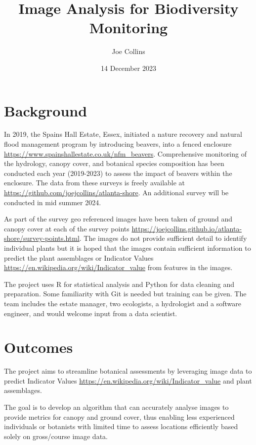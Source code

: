 \documentclass{roles}
\title{Image Analysis for Biodiversity Monitoring}
\author{Joe Collins}
\date{14 December 2023}
\begin{document}
\maketitle

\section*{Background}

In 2019, the Spains Hall Estate, Essex,
initiated a nature recovery and natural flood management program by introducing beavers,
into a fenced enclosure
\href{https://www.spainshallestate.co.uk/nfm\_beavers}{https://www.spainshallestate.co.uk/nfm\_beavers}.
Comprehensive monitoring of
the hydrology, canopy cover, and botanical species composition
has been conducted each year (2019-2023)
to assess the impact of beavers within the enclosure.
The data from these surveys is freely available at
\href{https://github.com/joejcollins/atlanta-shore}{https://github.com/joejcollins/atlanta-shore}.
An additional survey will be conducted in mid summer 2024.

As part of the survey geo referenced images have been taken
of ground and canopy cover at each of the survey points
\href{https://joejcollins.github.io/atlanta-shore/survey-points.html}{https://joejcollins.github.io/atlanta-shore/survey-points.html}.
The images do not provide sufficient detail to identify individual plants
but it is hoped that the images contain sufficient information to predict
the plant assemblages or Indicator Values
\href{https://en.wikipedia.org/wiki/Indicator\_value}{https://en.wikipedia.org/wiki/Indicator\_value}
from features in the images.

The project uses R for statistical analysis and Python for data cleaning and preparation.
Some familiarity with Git is needed but training can be given.
The team includes the estate manager, two ecologists, a hydrologist and a software engineer,
and would welcome input from a data scientist.

\section*{Outcomes}

The project aims to streamline botanical assessments by leveraging image data to predict Indicator Values
\href{https://en.wikipedia.org/wiki/Indicator\_value}{https://en.wikipedia.org/wiki/Indicator\_value} and plant assemblages.

The goal is to develop an algorithm that can accurately analyse images
to provide metrics for canopy and ground cover,
thus enabling less experienced individuals or
botanists with limited time to assess locations efficiently
based solely on gross/course image data.
\end{document}
